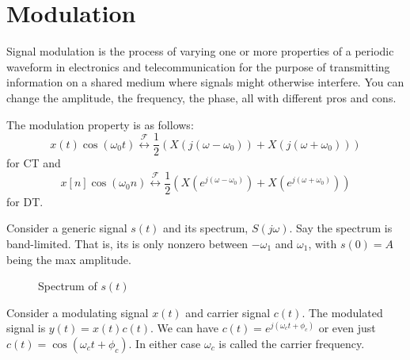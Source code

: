 \section{Modulation}
Signal modulation is the process of varying one or more properties of
a periodic waveform in electronics and telecommunication for the
purpose of transmitting information on a shared medium where signals might
otherwise interfere. You can change the amplitude, the frequency, the phase,
all with different pros and cons.

The modulation property is as follows:
\begin{equation}
    x(t)\cos(\omega_0 t) \overset{\mathcal{F}}{\leftrightarrow} \frac{1}{2}\left( X(j(\omega-\omega_0)) + X(j(\omega+\omega_0))\right)
\end{equation}
for CT and
\begin{equation}
    x[n]\cos(\omega_0 n)  \overset{\mathcal{F}}{\leftrightarrow}  \frac{1}{2}\left( X(e^{j(\omega-\omega_0)}) + X(e^{j(\omega+\omega_0)})\right)
\end{equation}
for DT.

Consider a generic signal $s(t)$ and its spectrum, $S(j\omega)$. Say
the spectrum is band-limited. That is, its is only nonzero between
$-\omega_1$ and $\omega_1$, with $s(0) = A$ being the max amplitude.
\begin{figure}
    \caption{Spectrum of $s(t)$}
\end{figure}

Consider a modulating signal $x(t)$ and carrier signal $c(t)$. The modulated
signal is $y(t) = x(t)c(t)$. We can have $c(t) = e^{j(\omega_c t + \phi_c)}$ or
even just $c(t) = \cos(\omega_c t + \phi_c)$. In either case $\omega_c$ is called
the carrier frequency.